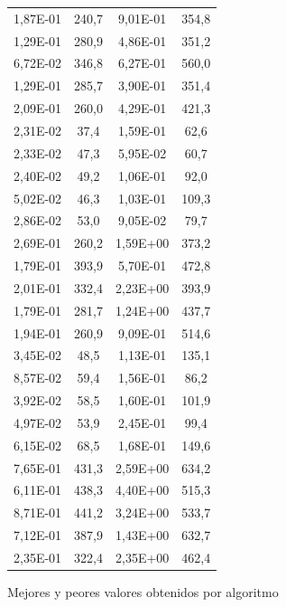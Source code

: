 \begin{figure}[h]
\begin{minipage}[r]{0.48\textwidth}
\begin{tabular}{|c|c|c|c|}
            1,87E-01 & 240,7 & 9,01E-01 & 354,8\\
            1,29E-01 & 280,9 & 4,86E-01 & 351,2\\
            6,72E-02 & 346,8 & 6,27E-01 & 560,0\\
            1,29E-01 & 285,7 & 3,90E-01 & 351,4\\
            2,09E-01 & 260,0 & 4,29E-01 & 421,3\\
            2,31E-02 & 37,4 & 1,59E-01 & 62,6\\
            2,33E-02 & 47,3 & 5,95E-02 & 60,7\\
            2,40E-02 & 49,2 & 1,06E-01 & 92,0\\
            5,02E-02 & 46,3 & 1,03E-01 & 109,3\\
            2,86E-02 & 53,0 & 9,05E-02 & 79,7\\
            2,69E-01 & 260,2 & 1,59E+00 & 373,2\\
            1,79E-01 & 393,9 & 5,70E-01 & 472,8\\
            2,01E-01 & 332,4 & 2,23E+00 & 393,9\\
            1,79E-01 & 281,7 & 1,24E+00 & 437,7\\
            1,94E-01 & 260,9 & 9,09E-01 & 514,6\\
            3,45E-02 & 48,5 & 1,13E-01 & 135,1\\
            8,57E-02 & 59,4 & 1,56E-01 & 86,2\\
            3,92E-02 & 58,5 & 1,60E-01 & 101,9\\
            4,97E-02 & 53,9 & 2,45E-01 & 99,4\\
            6,15E-02 & 68,5 & 1,68E-01 & 149,6\\
            7,65E-01 & 431,3 & 2,59E+00 & 634,2\\
            6,11E-01 & 438,3 & 4,40E+00 & 515,3\\
            8,71E-01 & 441,2 & 3,24E+00 & 533,7\\
            7,12E-01 & 387,9 & 1,43E+00 & 632,7\\
            2,35E-01 & 322,4 & 2,35E+00 & 462,4\\
	        \hline
	    \end{tabular}
	\end{minipage}
	\caption{Mejores y peores valores obtenidos por algoritmo}
	\label{fig:valoresLimite}
\end{figure}













